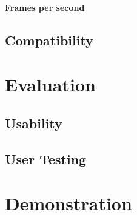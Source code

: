 	\paragraph{Frames per second}

	\subsection{Compatibility}

\section{Evaluation}
	\subsection{Usability}
	\subsection{User Testing}

\section{Demonstration}
